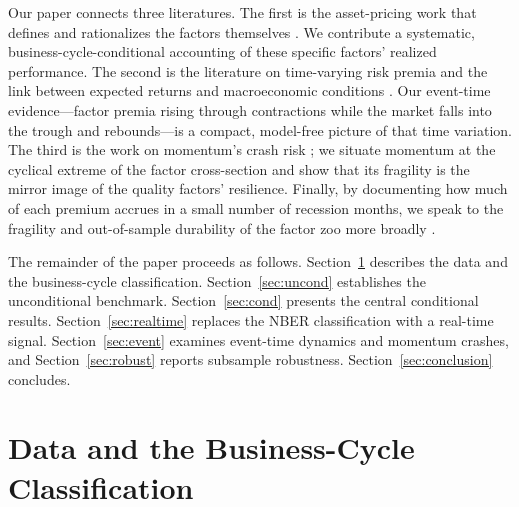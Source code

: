 \documentclass[12pt]{article}
\begin{document}
Our paper connects three literatures. The first is the asset-pricing work that
defines and rationalizes the factors themselves
\citep{fama1993common,fama2015five,novymarx2013other,cooper2008asset,
frazzini2014betting,asness2019quality}. We contribute a systematic,
business-cycle-conditional accounting of these specific factors' realized
performance. The second is the literature on time-varying risk premia and the
link between expected returns and macroeconomic conditions
\citep{chen1986economic,fama1989business,lettau2001resurrecting,
henkel2011conditional,liew2000can}. Our event-time evidence---factor premia
rising through contractions while the market falls into the trough and
rebounds---is a compact, model-free picture of that time variation. The third
is the work on momentum's crash risk \citep{daniel2016momentum,
barroso2015momentum}; we situate momentum at the cyclical extreme of the factor
cross-section and show that its fragility is the mirror image of the quality
factors' resilience. Finally, by documenting how much of each premium accrues
in a small number of recession months, we speak to the fragility and
out-of-sample durability of the factor zoo more broadly
\citep{mclean2016does,harvey2016cross}.

The remainder of the paper proceeds as follows. Section~\ref{sec:data}
describes the data and the business-cycle classification. Section~\ref{sec:uncond}
establishes the unconditional benchmark. Section~\ref{sec:cond} presents the
central conditional results. Section~\ref{sec:realtime} replaces the NBER
classification with a real-time signal. Section~\ref{sec:event} examines
event-time dynamics and momentum crashes, and Section~\ref{sec:robust} reports
subsample robustness. Section~\ref{sec:conclusion} concludes.

\section{Data and the Business-Cycle Classification}
\label{sec:data}
\end{document}
